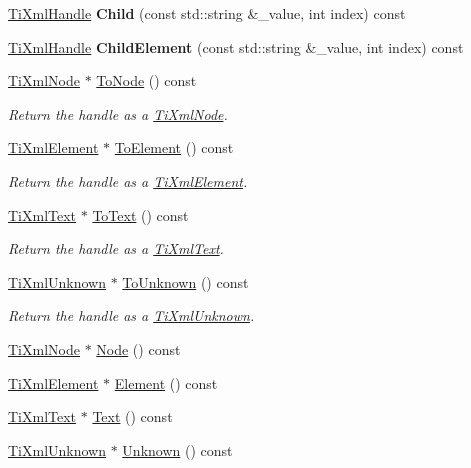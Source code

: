 \begin{DoxyCompactItemize}
\item 
\hyperlink{class_ti_xml_handle}{Ti\+Xml\+Handle} {\bfseries Child} (const std\+::string \&\+\_\+value, int index) const \hypertarget{class_ti_xml_handle_a5c4617db96789e9a5581dd5c12cdd287}{}\label{class_ti_xml_handle_a5c4617db96789e9a5581dd5c12cdd287}

\item 
\hyperlink{class_ti_xml_handle}{Ti\+Xml\+Handle} {\bfseries Child\+Element} (const std\+::string \&\+\_\+value, int index) const \hypertarget{class_ti_xml_handle_a2e5f7758156e6b29a8e7a423eca2cf5b}{}\label{class_ti_xml_handle_a2e5f7758156e6b29a8e7a423eca2cf5b}

\item 
\hyperlink{class_ti_xml_node}{Ti\+Xml\+Node} $\ast$ \hyperlink{class_ti_xml_handle_af678e5088e83be67baf76f699756f2c3}{To\+Node} () const 
\begin{DoxyCompactList}\small\item\em Return the handle as a \hyperlink{class_ti_xml_node}{Ti\+Xml\+Node}. \end{DoxyCompactList}\item 
\hyperlink{class_ti_xml_element}{Ti\+Xml\+Element} $\ast$ \hyperlink{class_ti_xml_handle_abc6e7ed383a5fe1e52b0c0004b457b9e}{To\+Element} () const 
\begin{DoxyCompactList}\small\item\em Return the handle as a \hyperlink{class_ti_xml_element}{Ti\+Xml\+Element}. \end{DoxyCompactList}\item 
\hyperlink{class_ti_xml_text}{Ti\+Xml\+Text} $\ast$ \hyperlink{class_ti_xml_handle_a4ac53a652296203a5b5e13854d923586}{To\+Text} () const 
\begin{DoxyCompactList}\small\item\em Return the handle as a \hyperlink{class_ti_xml_text}{Ti\+Xml\+Text}. \end{DoxyCompactList}\item 
\hyperlink{class_ti_xml_unknown}{Ti\+Xml\+Unknown} $\ast$ \hyperlink{class_ti_xml_handle_a1381c17507a130767b1e23afc93b3674}{To\+Unknown} () const 
\begin{DoxyCompactList}\small\item\em Return the handle as a \hyperlink{class_ti_xml_unknown}{Ti\+Xml\+Unknown}. \end{DoxyCompactList}\item 
\hyperlink{class_ti_xml_node}{Ti\+Xml\+Node} $\ast$ \hyperlink{class_ti_xml_handle_ab44b723a8dc9af72838a303c079d0376}{Node} () const 
\item 
\hyperlink{class_ti_xml_element}{Ti\+Xml\+Element} $\ast$ \hyperlink{class_ti_xml_handle_acb5fe8388a526289ea65e817a51e05e7}{Element} () const 
\item 
\hyperlink{class_ti_xml_text}{Ti\+Xml\+Text} $\ast$ \hyperlink{class_ti_xml_handle_a9fc739c8a18d160006f82572fc143d13}{Text} () const 
\item 
\hyperlink{class_ti_xml_unknown}{Ti\+Xml\+Unknown} $\ast$ \hyperlink{class_ti_xml_handle_a49675b74357ba2aae124657a9a1ef465}{Unknown} () const 
\end{DoxyCompactItemize}


